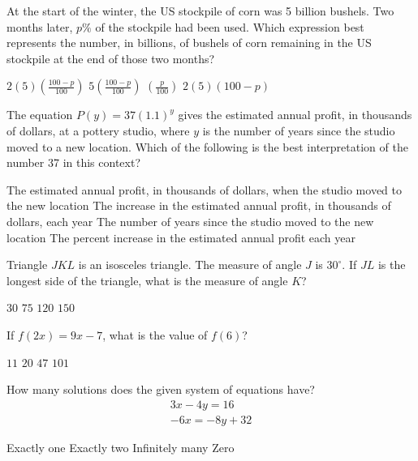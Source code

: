 \newpage


\question[1]
At the start of the winter, the US stockpile of corn was 5 billion bushels. Two months later, $p\%$ of the stockpile had been used. Which expression best represents the number, in billions, of bushels of corn remaining in the US stockpile at the end of those two months?
\begin{choices}
  \choice $2(5)\left(\frac{100-p}{100}\right)$
  \CorrectChoice $5\left(\frac{100-p}{100}\right)$
  \choice $\left(\frac{p}{100}\right)$
  \choice $2(5)(100-p)$
\end{choices}

\question[1]
The equation $P(y)=37(1.1)^y$ gives the estimated annual profit, in thousands of dollars, at a pottery studio, where $y$ is the number of years since the studio moved to a new location. Which of the following is the best interpretation of the number 37 in this context?
\begin{choices}
  \CorrectChoice The estimated annual profit, in thousands of dollars, when the studio moved to the new location
  \choice The increase in the estimated annual profit, in thousands of dollars, each year
  \choice The number of years since the studio moved to the new location
  \choice The percent increase in the estimated annual profit each year
\end{choices}

\question[1]
Triangle $JKL$ is an isosceles triangle. The measure of angle $J$ is $30^\circ$. If $JL$ is the longest side of the triangle, what is the measure of angle $K$?
\begin{choices}
  \choice $30$
  \choice $75$
  \CorrectChoice $120$
  \choice $150$
\end{choices}




\newpage




\question[1]
If $f(2x)=9x-7$, what is the value of $f(6)$?
\begin{choices}
  \choice $11$
  \CorrectChoice $20$
  \choice $47$
  \choice $101$
\end{choices}

\question[1]
How many solutions does the given system of equations have?
\[
  \begin{gathered}
  3x-4y=16 \\
  -6x=-8y+32
  \end{gathered}
\]
\begin{choices}
  \choice Exactly one
  \choice Exactly two
  \choice Infinitely many
  \CorrectChoice Zero
\end{choices}

